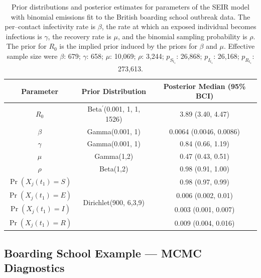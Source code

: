 \begin{table}[htbp]
	\begin{center}
		\begin{tabular}{ccc}
			\hline Parameter &  Prior Distribution & Posterior Median (95\% BCI)  \\ 
			\hline
			\hline $R_0$ & Beta$ ^\prime $(0.001, 1, 1, 1526) & 3.89 (3.40, 4.47) \\
			\hline $\beta$ & Gamma(0.001, 1) & 0.0064 (0.0046, 0.0086) \\ 
			\hline $ \gamma $ & Gamma(0.001, 1) & 0.84 (0.66, 1.19) \\
			\hline $\mu$ & Gamma(1,2) & 0.47 (0.43, 0.51) \\ 
			\hline $\rho $ & Beta(1,2) & 0.98 (0.91, 1.00)\\
			\hline $\Pr(X_j(t_1) = S)$& \multirow{4}{*}{Dirichlet(900, 6,3,9)} & 0.98 (0.97, 0.99) \\
			\hline $ \Pr(X_j(t_1) = E) $ & & 0.006 (0.002, 0.01)\\
			$\Pr(X_j(t_1) = I)$& & 0.003 (0.001, 0.007) \\
			$\Pr(X_j(t_1) = R)$&  & 0.009 (0.004, 0.016)\\
			\hline 
		\end{tabular}
		\caption[Prior distributions for an SEIR model fit to the British boarding school outbreak data.]{Prior distributions and posterior estimates for parameters of the SEIR model with binomial emissions fit to the British boarding school outbreak data. The per--contact infectivity rate is $ \beta $, the rate at which an exposed individual becomes infectious is $ \gamma $, the recovery rate is $ \mu $, and the binomial sampling probability is $ \rho $. The prior for $ R_0 $ is the implied prior induced by the priors for $ \beta $ and $ \mu $. Effective sample size were $\beta$: 679; $\gamma$: 658; $\mu$: 10,069; $ \rho $: 3,244; $p_{S_{t_1}}$: 26,868; $p_{I_{t_1}}$: 26,168; $p_{R_{t_1}}$: 273,613.}
		\label{tab:bbs_SEIR_prior_binom}
	\end{center}
\end{table}

\subsection{Boarding School Example --- MCMC Diagnostics}

